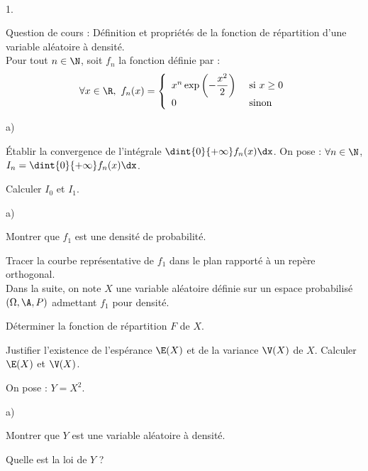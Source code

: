 \documentclass[11pt]{article}%
\begin{document}
\begin{exerciceAP}~
  \begin{noliste}{1.}
    \setlength{\itemsep}{2mm}
  \item Question de cours : Définition et propriétés de la fonction de
    répartition d'une variable aléatoire à densité.\\
    Pour tout $n\in\N$, soit $f_n$ la fonction définie par :
    \[
    \forall x\in\R, \ f_n(x)= \left\{
      \begin{array}{ll}
        x^n \exp\left(-\dfrac{x^2}{2}\right) & \mbox{ si $x\geq 0$}\\
        0 & \mbox{ sinon}
      \end{array}
    \right.
    \]
  \item 
    \begin{noliste}{a)}
    \setlength{\itemsep}{2mm}
    \item Établir la convergence de l'intégrale $\dint{0}{+\infty}
      f_n(x)\dx$. On pose : $\forall n\in\N$, $I_n=\dint{0}{+\infty}
      f_n(x)\dx$.
    \item Calculer $I_0$ et $I_1$.
    \end{noliste}
  \item 
    \begin{noliste}{a)}
    \setlength{\itemsep}{2mm}
    \item Montrer que $f_1$ est une densité de probabilité.
    \item Tracer la courbe représentative de $f_1$ dans le plan
      rapporté à un repère orthogonal.\\
      Dans la suite, on note $X$ une variable aléatoire définie sur un
      espace probabilisé $(\Omega, \A,P)$ admettant $f_1$
      pour densité.
    \item Déterminer la fonction de répartition $F$ de $X$.
    \item Justifier l'existence de l'espérance $\E(X)$ et de la
      variance $\V(X)$ de $X$. Calculer $\E(X)$ et $\V(X)$.
    \end{noliste}
  \item On pose : $Y=X^2$.
    \begin{noliste}{a)}
    \setlength{\itemsep}{2mm}
    \item Montrer que $Y$ est une variable aléatoire à densité.
    \item Quelle est la loi de $Y$ ?
    \end{noliste}
  \end{noliste}
\end{exerciceAP}
\end{document}

